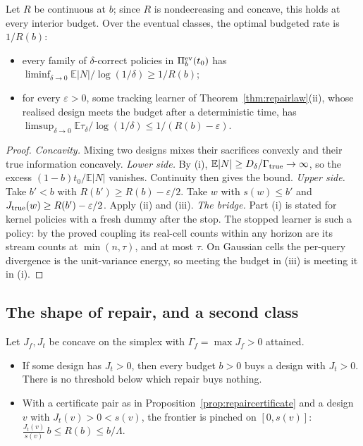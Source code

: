 \begin{corollary}
\label{cor:repairrate}
Let $R$ be continuous at $b$; since $R$ is nondecreasing and concave, this holds at every
interior budget. Over the eventual classes, the optimal budgeted rate is $1/R(b)$:
\begin{itemize}
\item every family of $\delta$-correct policies in $\Pi_b^{\rm ev}(t_0)$ has
$\liminf_{\delta\to0}\mathbb E|N|/\log(1/\delta)\ge1/R(b)$;
\item for every $\varepsilon>0$, some tracking learner of Theorem~\ref{thm:repairlaw}(ii),
whose realised design meets the budget after a deterministic time, has
$\limsup_{\delta\to0}\mathbb E\tau_\delta/\log(1/\delta)\le1/(R(b)-\varepsilon)$.
\end{itemize}
\end{corollary}
\begin{proof}
\emph{Concavity.} Mixing two designs mixes their sacrifices convexly and their true
information concavely.
\emph{Lower side.} By (i), $\mathbb E|N|\ge D_\delta/\Gamma_{\rm true}\to\infty$, so the
excess $(1-b)t_0/\mathbb E|N|$ vanishes. Continuity then gives the bound.
\emph{Upper side.} Take $b'<b$ with $R(b')\ge R(b)-\varepsilon/2$. Take $w$ with $s(w)\le b'$
and $J_{\rm true}(w)\ge R(b')-\varepsilon/2$. Apply (ii) and (iii).
\emph{The bridge.} Part (i) is stated for kernel policies with a fresh dummy after the stop.
The stopped learner is such a policy: by the proved coupling its real-cell counts within any
horizon are its stream counts at $\min(n,\tau)$, and at most $\tau$. On Gaussian cells the
per-query divergence is the unit-variance energy, so meeting the budget in (iii) is meeting it
in (i).
\end{proof}

\subsection{The shape of repair, and a second class}
\begin{proposition}
\label{prop:shape}
Let $J_f,J_t$ be concave on the simplex with $\Gamma_f=\max J_f>0$ attained.
\begin{itemize}
\item If some design has $J_t>0$, then every budget $b>0$ buys a design with $J_t>0$. There is
no threshold below which repair buys nothing.
\item With a certificate pair as in Proposition~\ref{prop:repaircertificate} and a design $v$
with $J_t(v)>0<s(v)$, the frontier is pinched on $[0,s(v)]$:
$\frac{J_t(v)}{s(v)}\,b\le R(b)\le b/\Lambda$.
\end{itemize}
\end{proposition}


